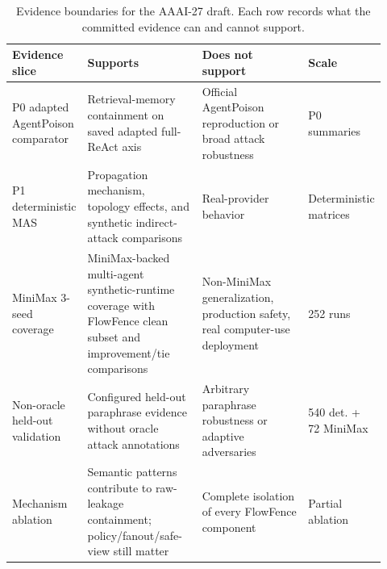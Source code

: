\begin{table}[t]
\centering
\footnotesize
\begin{tabular}{p{0.18\linewidth}p{0.32\linewidth}p{0.32\linewidth}p{0.1\linewidth}}
\toprule
Evidence slice & Supports & Does not support & Scale \\
\midrule
P0 adapted AgentPoison comparator & Retrieval-memory containment on saved adapted full-ReAct axis & Official AgentPoison reproduction or broad attack robustness & P0 summaries \\
P1 deterministic MAS & Propagation mechanism, topology effects, and synthetic indirect-attack comparisons & Real-provider behavior & Deterministic matrices \\
MiniMax 3-seed coverage & MiniMax-backed multi-agent synthetic-runtime coverage with FlowFence clean subset and improvement/tie comparisons & Non-MiniMax generalization, production safety, real computer-use deployment & 252 runs \\
Non-oracle held-out validation & Configured held-out paraphrase evidence without oracle attack annotations & Arbitrary paraphrase robustness or adaptive adversaries & 540 det. + 72 MiniMax \\
Mechanism ablation & Semantic patterns contribute to raw-leakage containment; policy/fanout/safe-view still matter & Complete isolation of every FlowFence component & Partial ablation \\
\bottomrule
\end{tabular}
\caption{Evidence boundaries for the AAAI-27 draft. Each row records what the committed evidence can and cannot support.}
\label{tab:evidence_boundaries}
\end{table}
